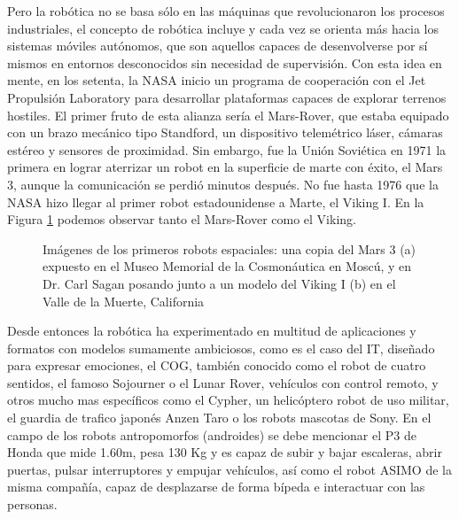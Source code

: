 Pero la robótica no se basa sólo en las máquinas que revolucionaron los procesos industriales, el concepto de robótica incluye y cada vez se orienta más hacia los sistemas móviles autónomos, que son aquellos capaces de desenvolverse por sí mismos en entornos desconocidos sin necesidad de supervisión. Con esta idea en mente, en los setenta, la NASA inicio un programa de cooperación con el Jet Propulsión Laboratory para desarrollar plataformas capaces de explorar terrenos hostiles. El primer fruto de esta alianza sería el Mars-Rover, que estaba equipado con un brazo mecánico tipo Standford, un dispositivo telemétrico láser, cámaras estéreo y sensores de proximidad. Sin embargo, fue la Unión Soviética en 1971 la primera en lograr aterrizar un robot en la superficie de marte con éxito, el Mars 3, aunque la comunicación se perdió minutos después. No fue hasta 1976 que la NASA hizo llegar al primer robot estadounidense a Marte, el Viking I. En la Figura \ref{fig:vikingmars} podemos observar tanto el Mars-Rover como el Viking.

\begin{figure}[t]
	\centering
	\hspace{0.05\textwidth}
	\caption[Los primeros robots espaciales, el Mars 3 y el Viking I]{Imágenes de los primeros robots espaciales: una copia del Mars 3 (a) expuesto en el Museo Memorial de la Cosmonáutica en Moscú, y en Dr. Carl Sagan posando junto a un modelo del Viking I (b) en el Valle de la Muerte, California} \label{fig:vikingmars}
\end{figure}

Desde entonces la robótica ha experimentado en multitud de aplicaciones y formatos con modelos sumamente ambiciosos, como es el caso del IT, diseñado para expresar emociones, el COG, también conocido como el robot de cuatro sentidos, el famoso Sojourner o el Lunar Rover, vehículos con control remoto, y otros mucho mas específicos como el Cypher, un helicóptero robot de uso militar, el guardia de trafico japonés Anzen Taro o los robots mascotas de Sony. En el campo de los robots antropomorfos (androides) se debe mencionar el P3 de Honda que mide 1.60m, pesa 130 Kg y es capaz de subir y bajar escaleras, abrir puertas, pulsar interruptores y empujar vehículos, así como el robot ASIMO de la misma compañía, capaz de desplazarse de forma bípeda e interactuar con las personas.

